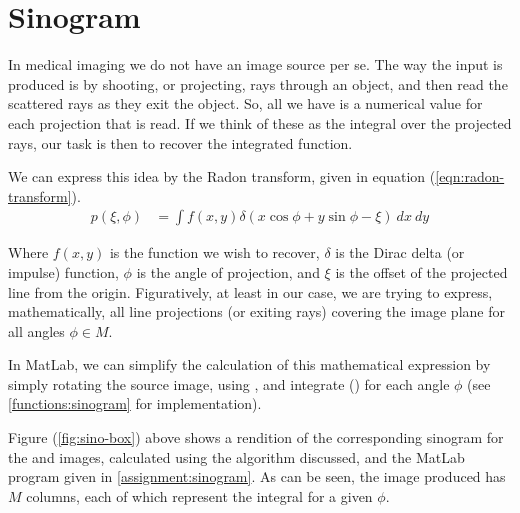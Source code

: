 %
%

\section{Sinogram}
In medical imaging we do not have an image source per se. The way the input is
produced is by shooting, or projecting, rays through an object, and then read
the scattered rays as they exit the object. So, all we have is a numerical
value for each projection that is read. If we think of these as the integral
over the projected rays, our task is then to recover the integrated function.

We can express this idea by the Radon transform, given in equation
(\ref{eqn:radon-transform}).
\begin{align}
    \label{eqn:radon-transform}
    p(\xi,\phi) &= \int f(x,y) \delta(x \cos \phi + y \sin \phi - \xi)
    {\ }dx{\ }dy
\end{align}

Where $f(x,y)$ is the function we wish to recover, $\delta$ is the Dirac delta
(or impulse) function, $\phi$ is the angle of projection, and $\xi$ is the
offset of the projected line from the origin. Figuratively, at least in our
case, we are trying to express, mathematically, all line projections (or
exiting rays) covering the image plane for all angles $\phi \in M$.

In MatLab, we can simplify the calculation of this mathematical expression by
simply rotating the source image, using , and integrate
() for each angle $\phi$ (see \ref{functions:sinogram} for
implementation).


Figure (\ref{fig:sino-box}) above shows a rendition of the corresponding
sinogram for the  and  images, calculated using
the algorithm discussed, and the MatLab program given in
\ref{assignment:sinogram}. As can be seen, the image produced has $M$ columns,
each of which represent the integral for a given $\phi$.
